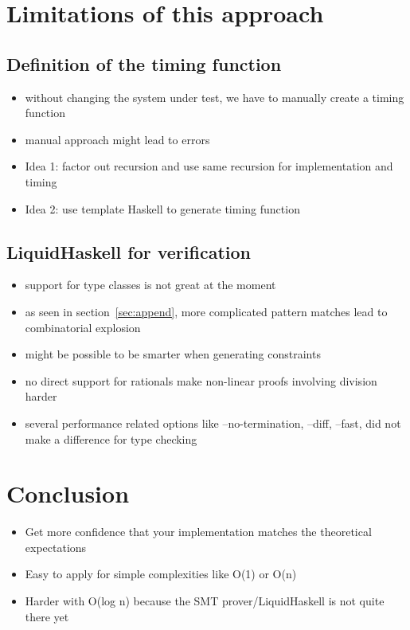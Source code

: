 \documentclass[sigplan,screen]{acmart}
\begin{document}
\section{Limitations of this approach}

\subsection{Definition of the timing function}

\begin{itemize}
\item{without changing the system under test, we have to manually create a timing function}
\item{manual approach might lead to errors}
\item{Idea 1: factor out recursion and use same recursion for implementation and timing}
\item{Idea 2: use template Haskell to generate timing function}
\end{itemize}

\subsection{LiquidHaskell for verification}

\begin{itemize}
\item{support for type classes is not great at the moment}
\item{as seen in section~\ref{sec:append}, more complicated pattern matches lead to combinatorial explosion}
\item{might be possible to be smarter when generating constraints}
\item{no direct support for rationals make non-linear proofs involving division harder}
\item{several performance related options like --no-termination, --diff, --fast, did not make a difference for type checking}
\end{itemize}

\section{Conclusion}

\begin{itemize}
\item{Get more confidence that your implementation matches the theoretical expectations}
\item{Easy to apply for simple complexities like O(1) or O(n)}
\item{Harder with O(log n) because the SMT prover/LiquidHaskell is not quite there yet}
\end{itemize}
\end{document}
